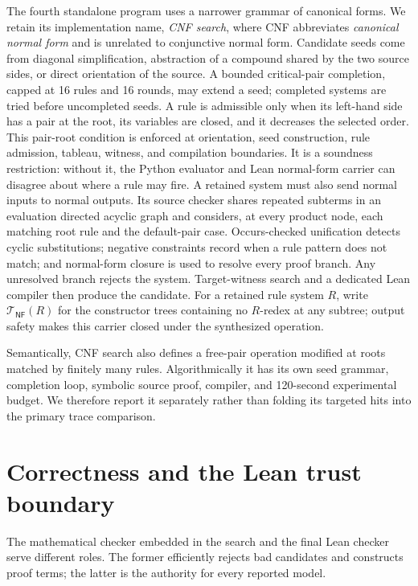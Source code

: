 \documentclass[runningheads]{llncs}
\newcommand{\Tree}{\mathcal{T}}
\begin{document}
The fourth standalone program uses a narrower grammar of canonical forms.  We
retain its implementation name, \emph{CNF search}, where CNF abbreviates
\emph{canonical normal form} and is unrelated to conjunctive normal form.
Candidate seeds come from diagonal simplification, abstraction of a compound
shared by the two source sides, or direct orientation of the source.
A bounded critical-pair completion, capped at 16 rules and 16 rounds, may
extend a seed; completed systems are tried before uncompleted seeds.  A rule is
admissible only when its left-hand side has a pair at the root, its variables
are closed, and it decreases the selected order.  This pair-root condition is
enforced at orientation, seed construction, rule admission, tableau,
witness, and compilation boundaries.  It is a soundness restriction: without
it, the Python evaluator and Lean normal-form carrier can disagree about where
a rule may fire.  A retained system must also send normal inputs to normal
outputs.  Its source checker shares repeated subterms in an evaluation directed
acyclic graph and considers, at every product node, each matching root rule and
the default-pair case.
Occurs-checked unification detects cyclic substitutions; negative constraints
record when a rule pattern does not match; and normal-form closure is used to
resolve every proof branch.  Any unresolved branch rejects the system.
Target-witness search and a dedicated Lean compiler then produce the candidate.
For a retained rule system $R$, write
$\Tree_{\mathsf{NF}}(R)$ for the constructor trees containing no $R$-redex at
any subtree; output safety makes this carrier closed under the synthesized
operation.

Semantically, CNF search also defines a free-pair operation modified at roots
matched by finitely many rules.  Algorithmically it has its own seed grammar,
completion loop, symbolic source proof, compiler, and 120-second experimental
budget.  We therefore report it separately rather than folding its targeted
hits into the primary trace comparison.

\section{Correctness and the Lean trust boundary}
\label{sec:soundness}

The mathematical checker embedded in the search and the final Lean checker
serve different roles.  The former efficiently rejects bad candidates and
constructs proof terms; the latter is the authority for every reported model.
\end{document}

